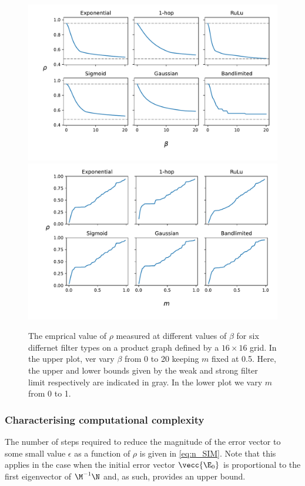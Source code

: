 \begin{figure}[t]
    \includegraphics[width=0.88\linewidth]{Figures/beta-rho-plot.pdf}
    \includegraphics[width=0.88\linewidth]{Figures/m-rho-plot.pdf}    
    \caption{\small{ The emprical  value of $\rho$ measured at different values of $\beta$ for six differnet filter types on a product graph defined by a $16 \times 16$ grid. In the upper plot, ver vary $\beta$ from 0 to 20 keeping $m$ fixed at 0.5. Here, the upper and lower bounds given by the weak and strong filter limit respectively are indicated in gray. In the lower plot we vary $m$ from 0 to 1. }}
    \label{fig:beta_rho_plot}
\end{figure}

\newpage


\subsubsection{Characterising computational complexity}

The number of steps required to reduce the magnitude of the error vector to some small value $\epsilon$ as a function of $\rho$ is given in \cref{eq:n_SIM}. Note that this applies in the case when the initial error vector $\vecc{\E_0}$ is proportional to the first eigenvector of $\M^{-1}\N$ and, as such, provides an upper bound.  


